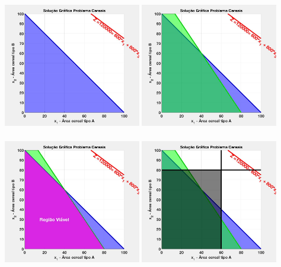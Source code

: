 \documentclass{beamer}
\begin{document}
\begin{frame}
\begin{columns}
\begin{column}{0.5\textwidth}
			\only<11-12> {\includegraphics[width=6cm,height=6cm]{MatLab/anima_10.png} }
			\only<13> {\includegraphics[width=6cm,height=6cm]{MatLab/anima_11.png} }
			\only<14-15> {\includegraphics[width=6cm,height=6cm]{MatLab/anima_12.png} }
			\only<16> {\includegraphics[width=6cm,height=6cm]{MatLab/anima_13.png} }

\end{column}
\end{columns}
\end{frame}
\end{document}
